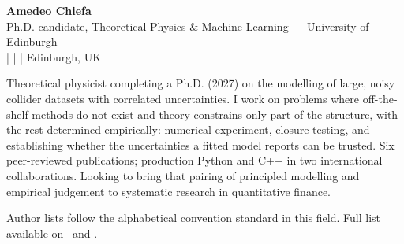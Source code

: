 \documentclass[10pt,a4paper]{article}
\begin{document}
\begin{center}
    {\LARGE \textbf{\sffamily Amedeo Chiefa}} \\[0.12cm]
    {\normalsize Ph.D. candidate, Theoretical Physics \& Machine Learning — University of Edinburgh} \\
    \vspace{0.15cm}
    \small
    \cvemaillink{} |
    \cvgithub{} |
    \cvlinkedin{} |
    Edinburgh, UK 
    \normalsize
\end{center}

\begin{cvlist}
  \item[] Theoretical physicist completing a Ph.D. (2027) on the modelling of
          large, noisy collider datasets with correlated uncertainties. I work
          on problems where off-the-shelf methods do not exist and theory
          constrains only part of the structure, with the rest determined
          empirically: numerical experiment, closure testing, and establishing
          whether the uncertainties a fitted model reports can be trusted. Six
          peer-reviewed publications; production Python and C++ in two
          international collaborations. Looking to bring that pairing of
          principled modelling and empirical judgement to systematic research in
          quantitative finance.
\end{cvlist}

\begin{cvlist}
\end{cvlist}

\begin{cvlist}
\end{cvlist}

\begin{cvlist}
\end{cvlist}

\begin{cvlist}
  \item[] \small Author lists follow the alphabetical convention standard in
  this field. Full list available on \inspirehep\ and \googlescholar.\normalsize
\end{cvlist}
\end{document}
